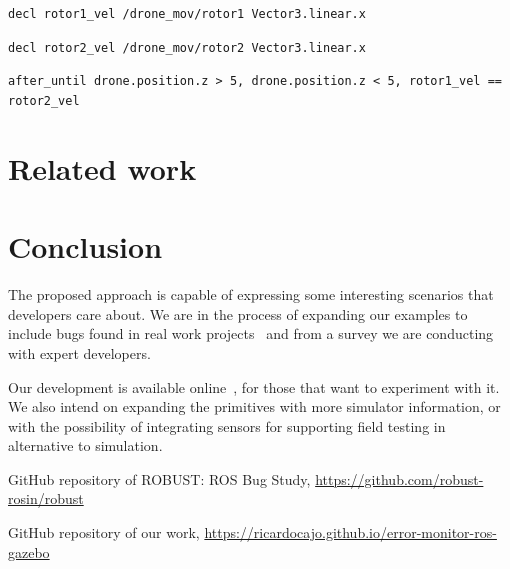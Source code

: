 \documentclass[runningheads]{llncs}
\begin{document}
\texttt{decl rotor1\_vel /drone\_mov/rotor1 Vector3.linear.x}

\texttt{decl rotor2\_vel /drone\_mov/rotor2 Vector3.linear.x}

\vspace{3mm}

\texttt{after\_until drone.position.z > 5, drone.position.z < 5, rotor1\_vel == rotor2\_vel}


\section{Related work}







\section{Conclusion}

The proposed approach is capable of expressing some interesting scenarios that developers care about. We are in the process of expanding our examples to include bugs found in real work projects~\cite{robust_repo} and from a survey we are conducting with expert developers.

Our development is available online~\cite{github_repo}, for those that want to experiment with it. We also intend on expanding the primitives with more simulator information, or with the possibility of integrating sensors for supporting field testing in alternative to simulation.


\begin{thebibliography}{8}


GitHub repository of ROBUST: ROS Bug Study, \url{https://github.com/robust-rosin/robust}

GitHub repository of our work, \url{https://ricardocajo.github.io/error-monitor-ros-gazebo}
\end{thebibliography}
\end{document}
